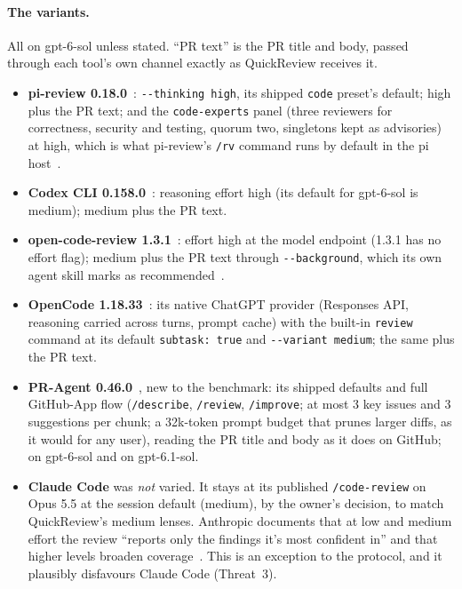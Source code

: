 \documentclass[11pt,a4paper]{article}
\newcommand{\qcr}{QuickReview}
\newcommand{\code}[1]{\texttt{#1}}
\begin{document}
\paragraph{The variants.} All on gpt-6-sol unless stated. ``PR text'' is the
PR title and body, passed through each tool's own channel exactly as \qcr{}
receives it.
\begin{itemize}
  \item \textbf{pi-review 0.18.0}~\cite{pireview}: \code{-{}-thinking high},
  its shipped \code{code} preset's default; high plus the PR text; and the
  \code{code-experts} panel (three reviewers for correctness, security and
  testing, quorum two, singletons kept as advisories) at high, which is what
  pi-review's \code{/rv} command runs by default in the pi
  host~\cite{pireview}.
  \item \textbf{Codex CLI 0.158.0}~\cite{codex}: reasoning effort high (its
  default for gpt-6-sol is medium); medium plus the PR text.
  \item \textbf{open-code-review 1.3.1}~\cite{ocr}: effort high at the model
  endpoint (1.3.1 has no effort flag); medium plus the PR text through
  \code{-{}-background}, which its own agent skill marks as
  recommended~\cite{ocr}.
  \item \textbf{OpenCode 1.18.33}~\cite{opencode}: its native ChatGPT
  provider (Responses API, reasoning carried across turns, prompt cache) with
  the built-in \code{review} command at its default \code{subtask: true} and
  \code{-{}-variant medium}; the same plus the PR text.
  \item \textbf{PR-Agent 0.46.0}~\cite{pragent}, new to the benchmark: its
  shipped defaults and full GitHub-App flow (\code{/describe},
  \code{/review}, \code{/improve}; at most 3 key issues and 3 suggestions per
  chunk; a 32k-token prompt budget that prunes larger diffs, as it would
  for any user), reading the PR title and body as it does on GitHub; on
  gpt-6-sol and on gpt-6.1-sol.
  \item \textbf{Claude Code} was \emph{not} varied. It stays at its
  published \code{/code-review} on Opus 5.5 at the session default (medium),
  by the owner's decision, to match \qcr{}'s medium lenses. Anthropic
  documents that at low and medium effort the review ``reports only the
  findings it's most confident in'' and that higher levels broaden
  coverage~\cite{claudecode}. This is an exception to the protocol, and it
  plausibly disfavours Claude Code (Threat~3).
\end{itemize}
\end{document}
